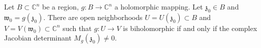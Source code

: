 Let $B \subset \mathbb{C}^n$ be a region, $g: B \to \mathbb{C}^n$ a holomorphic mapping. Let $\mathfrak{z}_0 \in B$ and $\mathfrak{w}_0 = g(\mathfrak{z}_0)$. There are open neighborhoods $U = U(\mathfrak{z}_0) \subset B$ and $V = V(\mathfrak{w}_0) \subset \mathbb{C}^n$ such that $g: U \to V$ is biholomorphic if and only if the complex Jacobian determinant $M_g(\mathfrak{z}_0) \neq 0$.
